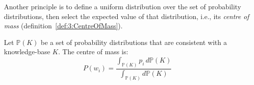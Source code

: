 Another principle is to define a uniform distribution over the set of
probability distributions, then select the expected value of that distribution,
i.e., its \textit{centre of mass} (definition~\ref{def:3:CentreOfMass}).

\begin{dfn}
  \label{def:3:CentreOfMass}
  Let $\mathbb{P}(K)$ be a set of probability distributions that are consistent
  with a knowledge-base $K$.
  The centre of mass is:
  \begin{equation}
    P(w_i) = \frac{\int_{\mathbb{P}(K)} p_i \, d \mathbb{P}(K)
    }{\int_{\mathbb{P}(K)} d \mathbb{P}(K)}
  \end{equation}
\end{dfn}
